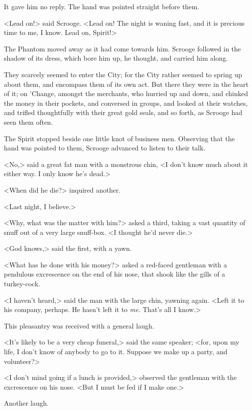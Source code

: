 It gave him no reply. The hand was pointed straight before them.

<Lead on!> said Scrooge. <Lead on! The night is waning fast, and it is precious time to me, I know. Lead on, Spirit!>

The Phantom moved away as it had come towards him. Scrooge followed in the shadow of its dress, which bore him up, he thought, and carried him along.

They scarcely seemed to enter the City; for the City rather seemed to spring up about them, and encompass them of its own act. But there they were in the heart of it; on 'Change, amongst the merchants, who hurried up and down, and chinked the money in their pockets, and conversed in groups, and looked at their watches, and trifled thoughtfully with their great gold seals, and so forth, as Scrooge had seen them often.

The Spirit stopped beside one little knot of business men. Observing that the hand was pointed to them, Scrooge advanced to listen to their talk.

<No,> said a great fat man with a monstrous chin, <I don't know much about it either way. I only know he's dead.>

<When did he die?> inquired another.

<Last night, I believe.>

<Why, what was the matter with him?> asked a third, taking a vast quantity of snuff out of a very large snuff-box. <I thought he'd never die.>

<God knows,> said the first, with a yawn.

<What has he done with his money?> asked a red-faced gentleman with a pendulous excrescence on the end of his nose, that shook like the gills of a turkey-cock.

<I haven't heard,> said the man with the large chin, yawning again. <Left it to his company, perhaps. He hasn't left it to \textit{me}. That's all I know.>

This pleasantry was received with a general laugh.

<It's likely to be a very cheap funeral,> said the same speaker; <for, upon my life, I don't know of anybody to go to it. Suppose we make up a party, and volunteer?>

<I don't mind going if a lunch is provided,> observed the gentleman with the excrescence on his nose. <But I must be fed if I make one.>

Another laugh.

